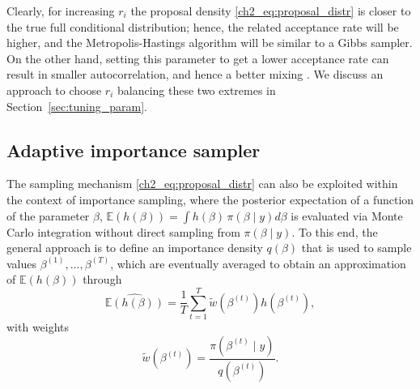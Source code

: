 %

Clearly, for increasing $r_i$ the proposal density \eqref{ch2_eq:proposal_distr} is closer to the true full conditional distribution; hence, the related acceptance rate will be higher, and the Metropolis-Hastings algorithm will be similar to a Gibbs sampler. 
On the other hand, setting this parameter to get a lower acceptance rate can result in smaller autocorrelation, and hence a better mixing \parencite{robert2010}. We discuss an approach to choose $r_i$ balancing these two extremes in Section~\ref{sec:tuning_param}.


\subsection{Adaptive importance sampler}
\label{ch2_sec:is}

The sampling mechanism \eqref{ch2_eq:proposal_distr} can also be exploited within the context of importance sampling, where the posterior expectation of a function of the parameter $\beta$, $\mathbb{E}\left( h(\beta) \right) = \int h(\beta)\, \pi(\beta \mid y) d\beta$ is evaluated via Monte Carlo integration without direct sampling from $\pi(\beta \mid y)$. To this end, the general approach is to define an importance density $q(\beta)$ that is used to sample values $\beta^{(1)}, \dots, \beta^{(T)}$, which are eventually averaged to obtain an approximation of $\mathbb{E}\left( h(\beta) \right)$ through
\[
\widehat{\mathbb{E}( h(\beta))} = \frac{1}{T} \sum_{t=1}^T \tilde{w}(\beta^{(t)}) h(\beta^{(t)}),
\]
with weights 
\begin{equation*}
\tilde{w}(\beta^{(t)}) = \frac{\pi(\beta^{(t)} \mid y)}{q(\beta^{(t)})}.
\end{equation*}

